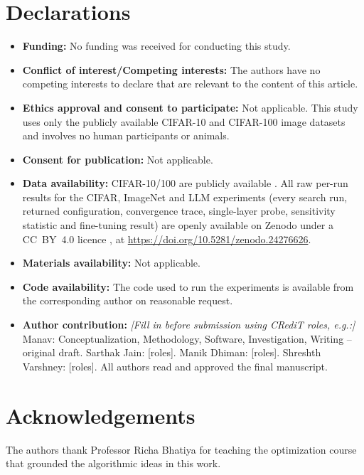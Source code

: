\documentclass[11pt,a4paper]{article}
\begin{document}
\section*{Declarations}
\begin{itemize}
\item \textbf{Funding:} No funding was received for conducting this study.
\item \textbf{Conflict of interest/Competing interests:} The authors have no competing interests to
      declare that are relevant to the content of this article.
\item \textbf{Ethics approval and consent to participate:} Not applicable. This study uses only the
      publicly available CIFAR-10 and CIFAR-100 image datasets and involves no human participants or
      animals.
\item \textbf{Consent for publication:} Not applicable.
\item \textbf{Data availability:} CIFAR-10/100 are publicly available \citep{Krizhevsky2009}. All raw
      per-run results for the CIFAR, ImageNet and LLM experiments (every search run, returned
      configuration, convergence trace, single-layer probe, sensitivity statistic and fine-tuning result) are openly available on Zenodo under a
      CC~BY~4.0 licence \citep{AbcqResults}, at \url{https://doi.org/10.5281/zenodo.24276626}.
\item \textbf{Materials availability:} Not applicable.
\item \textbf{Code availability:} The code used to run the experiments is available from the
      corresponding author on reasonable request.
\item \textbf{Author contribution:} \emph{[Fill in before submission using CRediT roles, e.g.:]}
      Manav: Conceptualization, Methodology, Software, Investigation, Writing -- original draft.
      Sarthak Jain: [roles]. Manik Dhiman: [roles]. Shreshth Varshney: [roles].
      All authors read and approved the final manuscript.
\end{itemize}

\section*{Acknowledgements}
The authors thank Professor Richa Bhatiya for teaching the optimization course that grounded the
algorithmic ideas in this work.



\end{document}
